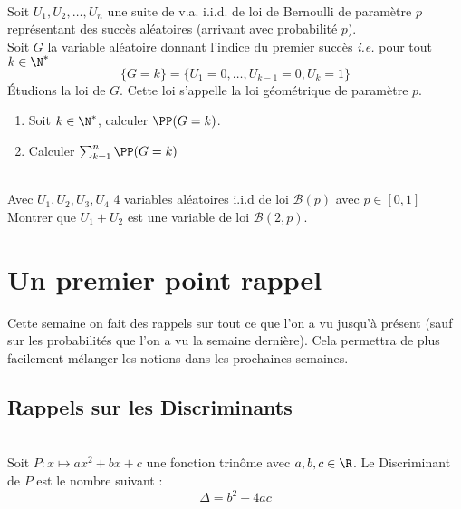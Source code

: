 \documentclass[12pt,fleqn]{report} %
\begin{document}
\begin{exercise}\label{Exercice 54 Loi Geom}\text{ }\\
	Soit $U_1,U_2,\dots,U_n$ une suite de v.a. i.i.d. de loi de Bernoulli de paramètre $p$ représentant des succès aléatoires (arrivant avec probabilité $p$).\\
	Soit $G$ la variable aléatoire donnant l'indice du premier succès \emph{i.e.} pour tout $k \in \N^*$ \[
	\lbrace G = k \rbrace = \lbrace U_1 = 0,\dots, U_{k-1} = 0, U_k = 1 \rbrace
	\]
	\'Etudions la loi de $G$. Cette loi s'appelle la loi géométrique de paramètre $p$.
	\begin{enumerate}
		\item Soit $k\in \N^*$, calculer $\PP(G = k)$.
		\item Calculer $\sum_{k = 1}^n \PP(G = k)$
	\end{enumerate}
\end{exercise}

\begin{exercise}\label{Exercice 42}\text{ }\\
	Avec $U_1,U_2,U_3,U_4$ 4 variables aléatoires i.i.d de loi $\mathcal{B}(p)$ avec $p \in [0,1]$ Montrer que $U_1 + U_2$ est une variable de loi $\mathcal{B}(2,p)$.
\end{exercise}


\setcounter{chapter}{7}
\chapter{Un premier point rappel}
Cette semaine on fait des rappels sur tout ce que l'on a vu jusqu'à présent (sauf sur les probabilités que l'on a vu la semaine dernière). Cela permettra de plus facilement mélanger les notions dans les prochaines semaines.
\section{Rappels sur les Discriminants}
\begin{definition}\text{ }\\
	Soit $P : x \mapsto a x^2 + bx + c$ une fonction trinôme avec $a,b,c \in \R$.
	Le Discriminant de $P$ est le nombre suivant : 
	\[
	\Delta = b^2 - 4ac
	\]
\end{definition}
\end{document}
